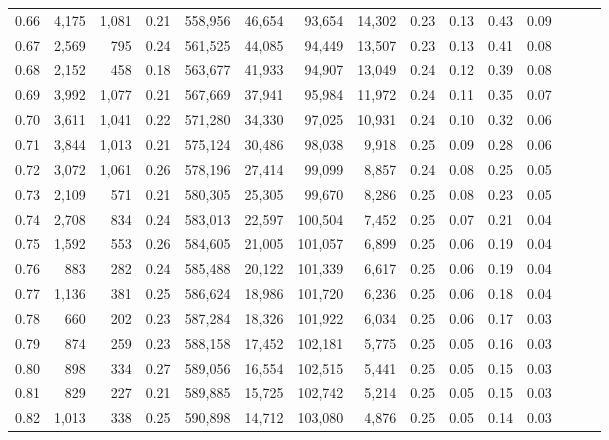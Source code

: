 \begin{tabular}{rrrrrrrrrrrrrrr}
0.66 &   4,175 &  1,081 &  0.21 &  558,956 &   46,654 &   93,654 &   14,302 &  0.23 &  0.13 &  0.43 &      0.09 \\
0.67 &   2,569 &    795 &  0.24 &  561,525 &   44,085 &   94,449 &   13,507 &  0.23 &  0.13 &  0.41 &      0.08 \\
0.68 &   2,152 &    458 &  0.18 &  563,677 &   41,933 &   94,907 &   13,049 &  0.24 &  0.12 &  0.39 &      0.08 \\
0.69 &   3,992 &  1,077 &  0.21 &  567,669 &   37,941 &   95,984 &   11,972 &  0.24 &  0.11 &  0.35 &      0.07 \\
0.70 &   3,611 &  1,041 &  0.22 &  571,280 &   34,330 &   97,025 &   10,931 &  0.24 &  0.10 &  0.32 &      0.06 \\
0.71 &   3,844 &  1,013 &  0.21 &  575,124 &   30,486 &   98,038 &    9,918 &  0.25 &  0.09 &  0.28 &      0.06 \\
0.72 &   3,072 &  1,061 &  0.26 &  578,196 &   27,414 &   99,099 &    8,857 &  0.24 &  0.08 &  0.25 &      0.05 \\
0.73 &   2,109 &    571 &  0.21 &  580,305 &   25,305 &   99,670 &    8,286 &  0.25 &  0.08 &  0.23 &      0.05 \\
0.74 &   2,708 &    834 &  0.24 &  583,013 &   22,597 &  100,504 &    7,452 &  0.25 &  0.07 &  0.21 &      0.04 \\
0.75 &   1,592 &    553 &  0.26 &  584,605 &   21,005 &  101,057 &    6,899 &  0.25 &  0.06 &  0.19 &      0.04 \\
0.76 &     883 &    282 &  0.24 &  585,488 &   20,122 &  101,339 &    6,617 &  0.25 &  0.06 &  0.19 &      0.04 \\
0.77 &   1,136 &    381 &  0.25 &  586,624 &   18,986 &  101,720 &    6,236 &  0.25 &  0.06 &  0.18 &      0.04 \\
0.78 &     660 &    202 &  0.23 &  587,284 &   18,326 &  101,922 &    6,034 &  0.25 &  0.06 &  0.17 &      0.03 \\
0.79 &     874 &    259 &  0.23 &  588,158 &   17,452 &  102,181 &    5,775 &  0.25 &  0.05 &  0.16 &      0.03 \\
0.80 &     898 &    334 &  0.27 &  589,056 &   16,554 &  102,515 &    5,441 &  0.25 &  0.05 &  0.15 &      0.03 \\
0.81 &     829 &    227 &  0.21 &  589,885 &   15,725 &  102,742 &    5,214 &  0.25 &  0.05 &  0.15 &      0.03 \\
0.82 &   1,013 &    338 &  0.25 &  590,898 &   14,712 &  103,080 &    4,876 &  0.25 &  0.05 &  0.14 &      0.03 \\

\end{tabular}
